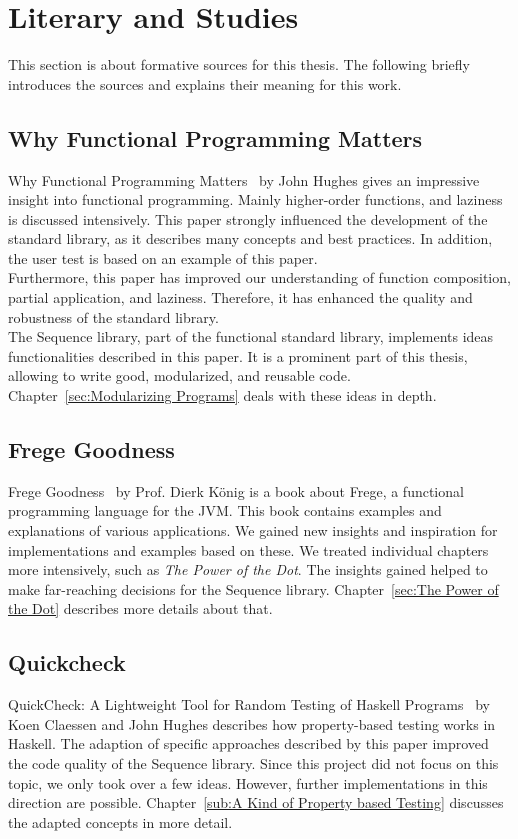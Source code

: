 \section{Literary and Studies}
\label{sec:Literary and Studies}
This section is about formative sources for this thesis. The following briefly
introduces the sources and explains their meaning for this work.

\subsection{Why Functional Programming Matters}
\label{sub:Functional Programming Matters}

Why Functional Programming Matters~\cite{hughes_why_1989} by John Hughes gives
an impressive insight into functional programming. Mainly higher-order
functions, and laziness is discussed intensively. This paper strongly
influenced the development of the standard library, as it describes many
concepts and best practices. In addition, the user test is based on an example
of this paper. \\ 
Furthermore, this paper has improved our understanding of function composition,
partial application, and laziness. Therefore, it has enhanced the quality and
robustness of the standard library. \\
The Sequence library, part of the functional standard library, implements ideas
functionalities described in this paper. It is a prominent part of this thesis,
allowing to write good, modularized, and reusable code.
Chapter~\ref{sec:Modularizing Programs} deals with these ideas in depth.


\subsection{Frege Goodness}
\label{sub:Frege Goodness}
Frege Goodness~\cite{frege_goodness} by Prof. Dierk König is a book about
Frege, a functional programming language for the JVM. This book contains
examples and explanations of various applications. We gained new insights and
inspiration for implementations and examples based on these. We treated
individual chapters more intensively, such as \textit{The Power of the Dot}.
The insights gained helped to make far-reaching decisions for the Sequence
library. Chapter~\ref{sec:The Power of the Dot} describes more details about
that.

\subsection{Quickcheck}
\label{sub:Quickcheck}
QuickCheck: A Lightweight Tool for Random Testing of Haskell
Programs~\cite{quickcheck_hughes} by Koen Claessen and John Hughes describes
how property-based testing works in Haskell. The adaption of specific
approaches described by this paper improved the code quality of the Sequence
library. Since this project did not focus on this topic, we only took over a few
ideas. However, further implementations in this direction are possible.
Chapter~\ref{sub:A Kind of Property based Testing} discusses the adapted
concepts in more detail. 

